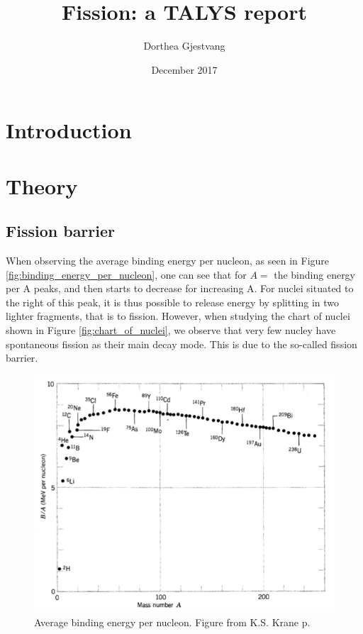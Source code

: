 \documentclass[]{article}
\title{}
\author{}
\begin{document}
	
\title{Fission: a TALYS report}
\author{Dorthea Gjestvang }
\date{December 2017}

\maketitle

\begin{abstract}

\end{abstract}

\section{Introduction}

\section{Theory}
\subsection{Fission barrier}
When observing the average binding energy per nucleon, as seen in Figure \ref{fig:binding_energy_per_nucleon}, one can see that for $A=$ the binding energy per A peaks, and then starts to decrease for increasing A. For nuclei situated to the right of this peak, it is thus possible to release energy by splitting in two lighter fragments, that is to fission. However, when studying the chart of nuclei shown in Figure \ref{fig:chart_of_nuclei}, we observe that very few nucley have spontaneous fission as their main decay mode. This is due to the so-called fission barrier.

\begin{figure}
	\centering
	\includegraphics[scale=0.7]{binding_energy_per_nucleon.png}
	\caption{Average binding energy per nucleon. Figure from K.S. Krane p. }
	\label{binding_energy_per_nucleon}
\end{figure}
\end{document}
